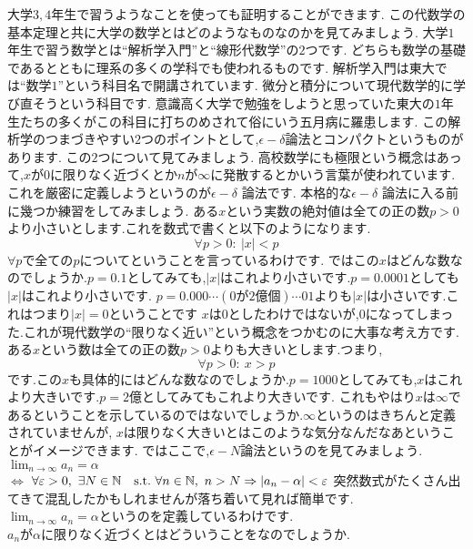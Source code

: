 大学$3,4$年生で習うようなことを使っても証明することができます.
この代数学の基本定理と共に大学の数学とはどのようなものなのかを見てみましょう.
大学$1$年生で習う数学とは``解析学入門''と``線形代数学''の$2$つです.
どちらも数学の基礎であるとともに理系の多くの学科でも使われるものです.
解析学入門は東大では``数学$1$''という科目名で開講されています.
微分と積分について現代数学的に学び直そうという科目です.
意識高く大学で勉強をしようと思っていた東大の$1$年生たちの多くがこの科目に打ちのめされて俗にいう五月病に羅患します.
この解析学のつまづきやすい$2$つのポイントとして,\large{$\epsilon-\delta$論法}と\large{コンパクト}というものがあります.
この$2$つについて見てみましょう.
高校数学にも極限という概念はあって,$x$が$0$に限りなく近づくとか$n$が$\infty$に発散するとかいう言葉が使われています.これを厳密に定義しようというのが$\epsilon - \delta$ 論法です.
本格的な$\epsilon - \delta$ 論法に入る前に幾つか練習をしてみましょう.
\ex
ある$x$という実数の絶対値は全ての正の数$p>0$より小さいとします.これを数式で書くと以下のようになります.
\[
\forall p > 0 : \ |x| < p
\]
$\forall p$で全ての$p$についてということを言っているわけです.
ではこの$x$はどんな数なのでしょうか.$p=0.1$としてみても,$|x|$はこれより小さいです.$p=0.0001$としても$|x|$はこれより小さいです.
$p=0.000\cdots (0が2億個) \cdots 01$よりも$|x|$は小さいです.これはつまり$|x| = 0$ということです
$x$は$0$としたわけではないが,$0$になってしまった.これが現代数学の``限りなく近い''という概念をつかむのに大事な考え方です.
\exx
\ex
ある$x$という数は全ての正の数$p>0$よりも大きいとします.つまり,
\[
\forall p > 0 : \ x > p
\]
です.この$x$も具体的にはどんな数なのでしょうか.$p=1000$としてみても,$x$はこれより大きいです.$p=2億$としてみてもこれより大きいです.
これもやはり$x$は$\infty$であるということを示しているのではないでしょうか.$\infty$というのはきちんと定義されていませんが,
$x$は限りなく大きいとはこのような気分なんだなあということがイメージできます.
\exx
ではここで,$\epsilon-N$論法というのを見てみましょう.
$\lim_{n\to\infty} a_n = \alpha $\\
$\iff$
$\forall \varepsilon > 0,\  \exists N \in \mathbb N \quad \textrm{s.t.}\  \forall n \in \mathbb N,\  n > N \Rightarrow |a_n - \alpha | < \varepsilon $
突然数式がたくさん出てきて混乱したかもしれませんが落ち着いて見れば簡単です.\\
$\lim_{n\to\infty} a_n = \alpha $というのを定義しているわけです.\\
$a_n$が$\alpha$に限りなく近づくとはどういうことをなのでしょうか.\\
